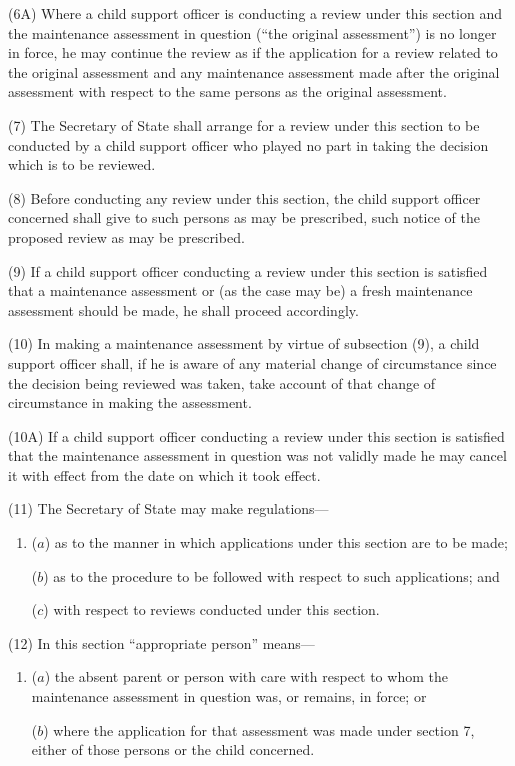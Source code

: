 \documentclass[12pt,a4paper]{article}
\begin{document}
(6A) Where a child support officer is conducting a review under this section and the maintenance assessment in question (“the original assessment”) is no longer in force, he may continue the review as if the application for a review related to the original assessment and any maintenance assessment made after the original assessment with respect to the same persons as the original assessment.

(7) The Secretary of State shall arrange for a review under this section to be conducted by a child support officer who played no part in taking the decision which is to be reviewed.

(8) Before conducting any review under this section, the child support officer concerned shall give to such persons as may be prescribed, such notice of the proposed review as may be prescribed.

(9) If a child support officer conducting a review under this section is satisfied that a maintenance assessment or (as the case may be) a fresh maintenance assessment should be made, he shall proceed accordingly.

(10) In making a maintenance assessment by virtue of subsection (9), a child support officer shall, if he is aware of any material change of circumstance since the decision being reviewed was taken, take account of that change of circumstance in making the assessment.

(10A) If a child support officer conducting a review under this section is satisfied that the maintenance assessment in question was not validly made he may cancel it with effect from the date on which it took effect.

(11) The Secretary of State may make regulations—
\begin{enumerate}\item[]
($a$) as to the manner in which applications under this section are to be made;

($b$) as to the procedure to be followed with respect to such applications; and

($c$) with respect to reviews conducted under this section.
\end{enumerate}

(12) In this section “appropriate person” means—
\begin{enumerate}\item[]
($a$) the absent parent or person with care with respect to whom the maintenance assessment in question was, or remains, in force; or

($b$) where the application for that assessment was made under section 7, either of those persons or the child concerned.
\end{enumerate}
\end{document}
